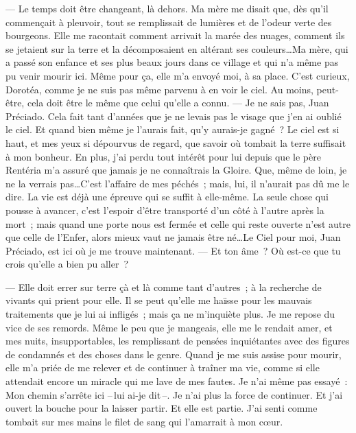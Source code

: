   --- Le temps doit être changeant, là dehors. Ma mère me disait que, dès qu’il commençait à pleuvoir, tout se remplissait de lumières et de l’odeur verte des bourgeons. Elle me racontait comment arrivait la marée des nuages, comment ils se jetaient sur la terre et la décomposaient en altérant ses couleurs\ldots Ma mère, qui a passé son enfance et ses plus beaux jours dans ce village et qui n’a même pas pu venir mourir ici. Même pour ça, elle m’a envoyé moi, à sa place. C’est curieux, Dorotéa, comme je ne suis pas même parvenu à en voir le ciel. Au moins, peut-être, cela doit être le même que celui qu’elle a connu.
\pend
%
\pstart
  --- Je ne sais pas, Juan Préciado. Cela fait tant d’années que je ne levais pas le visage que j’en ai oublié le ciel. Et quand bien même je l'aurais fait, qu’y aurais-je gagné ? Le ciel est si haut, et mes yeux si dépourvus de regard, que savoir où tombait la terre suffisait à mon bonheur. En plus, j’ai perdu tout intérêt pour lui depuis que le père Rentéria m’a assuré que jamais je ne connaîtrais la Gloire. Que, même de loin, je ne la verrais pas\ldots C’est l’affaire de mes péchés ; mais, lui, il n’aurait pas dû me le dire. La vie est déjà une épreuve qui se suffit à elle-même. La seule chose qui pousse à avancer, c’est l’espoir d’être transporté d’un côté à l’autre après la mort ; mais quand une porte nous est fermée et celle qui reste ouverte n'est autre que celle de l'Enfer, alors mieux vaut ne jamais être né\ldots Le Ciel pour moi, Juan Préciado, est ici où je me trouve maintenant.
\pend
%
\pstart
  --- Et ton âme ? Où est-ce que tu crois qu’elle a bien pu aller ?

  --- Elle doit errer sur terre çà et là comme tant d’autres ; à la recherche de vivants qui prient pour elle. Il se peut qu’elle me haïsse pour les mauvais traitements que je lui ai infligés ; mais ça ne m’inquiète plus. Je me repose du vice de ses remords. Même le peu que je mangeais, elle me le rendait amer, et mes nuits, insupportables, les remplissant de pensées inquiétantes avec des figures de condamnés et des choses dans le genre. Quand je me suis assise pour mourir, elle m’a priée de me relever et de continuer à traîner ma vie, comme si elle attendait encore un miracle qui me lave de mes fautes. Je n’ai même pas essayé : \og{}Mon chemin s’arrête ici --\,lui ai-je dit\,--. Je n'ai plus la force de continuer.\fg{} Et j’ai ouvert la bouche pour la laisser partir. Et elle est partie. J’ai senti comme tombait sur mes mains le filet de sang qui l’amarrait à mon cœur.
\pend
